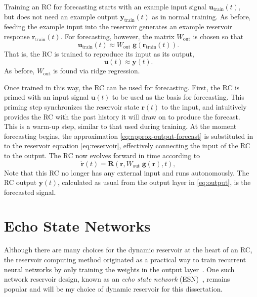 Training an RC for forecasting starts with an example input signal
$\bm{u}_\text{train}(t)$, but does not need an example output
$\bm{y}_\text{train}(t)$ as in normal training. As before, feeding the
example input into the reservoir generates an example reservoir
response $\bm{r}_\text{train}(t)$. For forecasting, however, the matrix
$W_\text{out}$ is chosen so that
\begin{equation}
  \label{eq:approx-output-forecast}
  \mathbf{u}_\text{train}(t) \approx W_\text{out}\;\mathbf{g}\left(\mathbf{r}_\text{train}(t)\right).
\end{equation}
That is, the RC is trained to reproduce its input as its output,
\begin{equation}
  \label{eq:approx-output-input}
  \bm{u}(t) \approx \bm{y}(t).
\end{equation}
As before, $W_\text{out}$ is found via ridge regression.

Once trained in this way, the RC can be used for forecasting. First,
the RC is primed with an input signal $\bm{u}(t)$ to be used as the
basis for forecasting. This priming step synchronizes the reservoir
state $\bm{r}(t)$ to the input, and intuitively provides the RC with
the past history it will draw on to produce the forecast. This is a
warm-up step, similar to that used during training. At the moment
forecasting begins, the approximation \cref{eq:approx-output-forecast} is
substituted in to the reservoir equation \cref{eq:reservoir},
effectively connecting the input of the RC to the output. The RC now
evolves forward in time according to
\begin{equation}
  \label{eq:reservoir-auto}
  \dot{\mathbf{r}}(t) = \mathbf{R}\left(\mathbf{r}, W_\text{out}\;\bm{g}(\bm{r}), t\right),
\end{equation}
Note that this RC no longer has any external input and runs
autonomously. The RC output $\bm{y}(t)$, calculated as usual from the
output layer in \cref{eq:output}, is the forecasted signal.

\section{Echo State Networks}\label{sec:esn}

Although there are many choices for the dynamic reservoir at the heart
of an RC, the reservoir computing method originated as a practical way
to train recurrent neural networks by only training the weights in the
output layer~\cite{lukosevicius2009}. One such network reservoir
design, known as an \emph{echo state network} (ESN)~\cite{jaeger2001},
remains popular and will be my choice of dynamic reservoir for this
dissertation.

